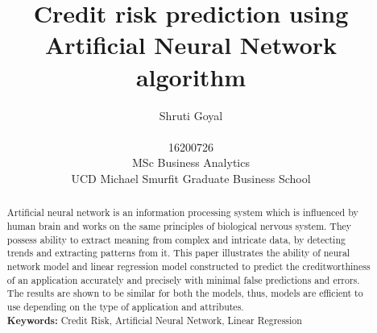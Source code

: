 \documentclass{article}[]
\begin{document}
\title{{\bf Credit risk prediction using Artificial Neural Network algorithm}\\ }

\author{Shruti Goyal\\ \vspace{0.4cm}\\ 
 16200726 \vspace{0.1cm}\\ MSc Business Analytics \vspace{0.1cm}\\ 
 UCD Michael Smurfit Graduate Business School}

\date{}
\maketitle
\begin{abstract}
  Artificial neural network is an information processing system which is influenced by human brain and works on the same principles of biological nervous system. They possess ability to extract meaning from complex and intricate data, by detecting trends and extracting patterns from it. This paper illustrates the ability of neural network model and linear regression model constructed to predict the creditworthiness of an application accurately and precisely with minimal false predictions and errors. The results are shown to be similar for both the models, thus, models are efficient to use depending on the type of application and attributes. \\
  \textbf{Keywords:} Credit Risk, Artificial Neural Network, Linear Regression
\end{abstract}
\end{document}
